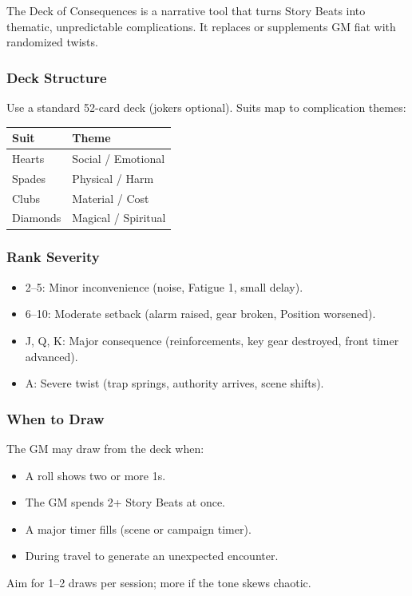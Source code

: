 The Deck of Consequences is a narrative tool that turns Story Beats into thematic, unpredictable complications. It replaces or supplements GM fiat with randomized twists.

\subsubsection{Deck Structure}
Use a standard 52-card deck (jokers optional). Suits map to complication themes:

\begin{tabular}{@{}ll@{}}
\toprule
\textbf{Suit} & \textbf{Theme} \\
\midrule
Hearts   & Social / Emotional \\
Spades   & Physical / Harm \\
Clubs    & Material / Cost \\
Diamonds & Magical / Spiritual \\
\bottomrule
\end{tabular}

\subsubsection{Rank Severity}
\begin{itemize}
  \item 2--5: Minor inconvenience (noise, Fatigue 1, small delay).
  \item 6--10: Moderate setback (alarm raised, gear broken, Position worsened).
  \item J, Q, K: Major consequence (reinforcements, key gear destroyed, front timer advanced).
  \item A: Severe twist (trap springs, authority arrives, scene shifts).
\end{itemize}

\subsubsection{When to Draw}
The GM may draw from the deck when:
\begin{itemize}
  \item A roll shows two or more 1s.
  \item The GM spends 2+ Story Beats at once.
  \item A major timer fills (scene or campaign timer).
  \item During travel to generate an unexpected encounter.
\end{itemize}
Aim for 1--2 draws per session; more if the tone skews chaotic.

